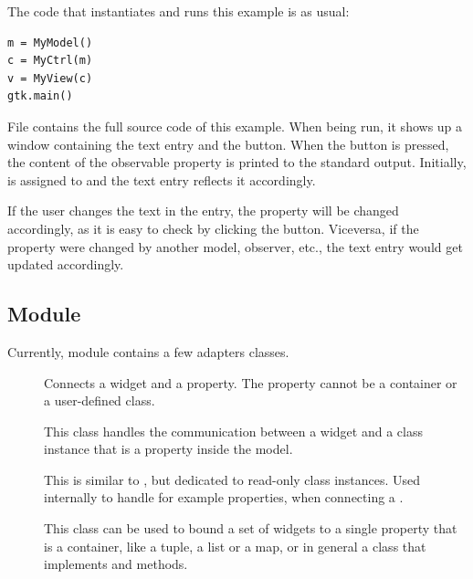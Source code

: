 The code that instantiates and runs this example is as usual:
{ \codesize
\begin{verbatim}
m = MyModel()
c = MyCtrl(m)
v = MyView(c)
gtk.main()
\end{verbatim}
}

File  contains the full source
code of this example. When being run, it shows up a window
containing the text entry and the button. When the button is
pressed, the content of the observable property  is
printed to the standard output. Initially,  is
assigned to  and the text entry reflects it
accordingly.

If the user changes the text in the entry, the property
 will be changed accordingly, as it is easy to check
by clicking the button. Viceversa, if the property 
were changed by another model, observer, etc., the text entry would
get updated accordingly.


\subsection{Module }
Currently, module  contains a few adapters
classes.

\begin{description}
\item [] Connects a widget and a property. The
  property cannot be a container or a user-defined class.

\item [] This class handles the
  communication between a widget and a class instance that is a
  property inside the model.

\item [] This is similar to
  , but dedicated to read-only class
  instances. Used internally to handle for example
   properties, when connecting a
  .

\item [] This class can be used to
  bound a set of widgets to a single property that is a container,
  like a tuple, a list or a map, or in general a class that
  implements  and
   methods.
\end{description}


